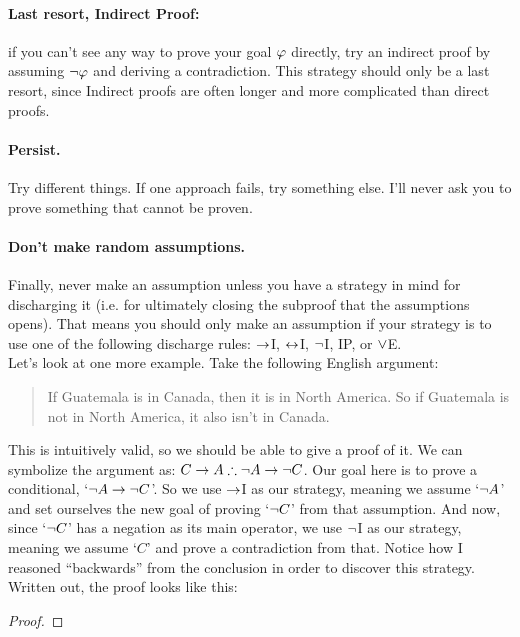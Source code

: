 \paragraph{Last resort, Indirect Proof:} if you can't see any way to prove your goal $\mathcal{\varphi}$ directly, try an indirect proof by assuming $\neg \mathcal{\varphi}$ and deriving  a contradiction. This strategy should only be  a last resort, since Indirect proofs are often longer and more complicated than direct proofs.

\paragraph{Persist.}
Try different things. If one approach fails, try something else.  I'll never ask you to prove something that cannot be proven.

\paragraph{Don't make random assumptions.} Finally, never make an assumption unless you have a strategy in mind for discharging it (i.e. for ultimately closing the subproof that the assumptions opens).  That means you should only make an assumption if your strategy is to use one of the following discharge rules: $\rightarrow$I, $\leftrightarrow$I, $\neg$I, IP, or $\vee$E.\\


Let's look at one more example.  Take the following English argument:
\begin{quote}
If Guatemala is in Canada, then it is in North America. So if Guatemala is not in North America, it also isn't in Canada.
\end{quote}
This is intuitively valid, so we should be able to give a proof of it.  We can symbolize the argument as: $C \rightarrow A \therefore \neg A \rightarrow \neg C$.	Our goal here is to prove a conditional, `$\neg A \rightarrow \neg C$'.  So we use $\rightarrow$I as our strategy, meaning we assume `$\neg A$' and set ourselves the new goal of proving `$\neg C$' from that assumption.  And now, since `$\neg C$' has a negation as its main operator, we use $\neg$I as our strategy, meaning we assume `$C$' and prove a contradiction from that.  Notice how I reasoned ``backwards'' from the conclusion in order to discover this strategy.  Written out, the proof looks like this:


\begin{proof}
  
\open
	 
	\open
		 
		 
		 
	\close
	 
\close
{} 
\end{proof}

